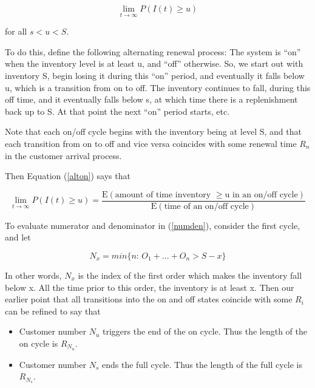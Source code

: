 \begin{equation}
\lim_{t\rightarrow \infty }P(I(t)\geq u)
\end{equation}

for all $s < u < S$.

To do this, define the following alternating renewal process: The system
is ``on'' when the inventory level is at least u, and ``off'' otherwise.
So, we start out with inventory S, begin losing it during this ``on''
period, and eventually it falls below u, which is a transition from on
to off.  The inventory continues to fall, during this off time, and it
eventually falls below s, at which time there is a replenishment back up
to S.  At that point the next ``on'' period starts, etc.

Note that each on/off cycle begins with the inventory being at level S,
and that each transition from on to off and vice versa coincides with
some renewal time $R_{n}$ in the customer arrival
process.

Then Equation (\ref{alton}) says that

\begin{equation}  
\label{numden}
\lim_{t\rightarrow \infty }P(I(t)\geq u)=\frac{\textrm{E}(\textrm{amount of time inventory }\geq \textrm{u in an on}/\textrm{off cycle})}{\textrm{E}(\textrm{time of an on}/\textrm{off cycle})}
\end{equation}

To evaluate numerator and denominator in (\ref{numden}), consider the first
cycle, and let 

\begin{equation}
\label{oddrnprocess}
N_{x}=min\{n:\, O_{1}+...+O_{n}>S-x\}
\end{equation}

In other words, $N_{x}$ is the index of the first order which makes the
inventory fall below x.  All the time prior to this order, the inventory
is at least x. Then our earlier point that all transitions
into the on and off states coincide with some $R_i$ can be refined to
say that

\begin{itemize}

\item Customer number $N_u$ triggers the end of the on cycle.  Thus the
length of the on cycle is $R_{N_u}$.

\item Customer number $N_s$ ends the full cycle.  Thus the
length of the full cycle is $R_{N_s}$.

\end{itemize}

